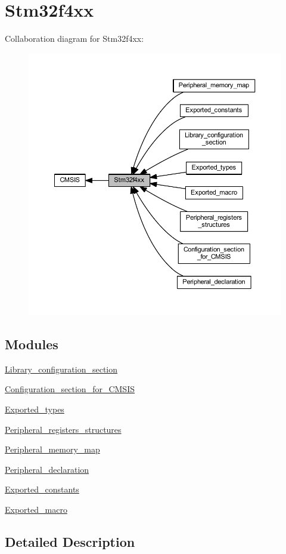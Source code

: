 \hypertarget{group__stm32f4xx}{}\section{Stm32f4xx}
\label{group__stm32f4xx}
Collaboration diagram for Stm32f4xx\+:
\nopagebreak
\begin{figure}[H]
\begin{center}
\leavevmode
\includegraphics[width=350pt]{group__stm32f4xx}
\end{center}
\end{figure}
\subsection*{Modules}
\begin{DoxyCompactItemize}
\item 
\hyperlink{group___library__configuration__section}{Library\+\_\+configuration\+\_\+section}
\item 
\hyperlink{group___configuration__section__for___c_m_s_i_s}{Configuration\+\_\+section\+\_\+for\+\_\+\+C\+M\+S\+IS}
\item 
\hyperlink{group___exported__types}{Exported\+\_\+types}
\item 
\hyperlink{group___peripheral__registers__structures}{Peripheral\+\_\+registers\+\_\+structures}
\item 
\hyperlink{group___peripheral__memory__map}{Peripheral\+\_\+memory\+\_\+map}
\item 
\hyperlink{group___peripheral__declaration}{Peripheral\+\_\+declaration}
\item 
\hyperlink{group___exported__constants}{Exported\+\_\+constants}
\item 
\hyperlink{group___exported__macro}{Exported\+\_\+macro}
\end{DoxyCompactItemize}


\subsection{Detailed Description}
